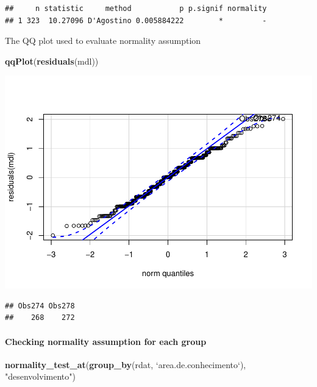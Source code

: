 \documentclass[]{article}
\newenvironment{Shaded}{\begin{snugshade}}{\end{snugshade}}
\newcommand{\DataTypeTok}[1]{\textcolor[rgb]{0.13,0.29,0.53}{#1}}
\newcommand{\KeywordTok}[1]{\textcolor[rgb]{0.13,0.29,0.53}{\textbf{#1}}}
\newcommand{\NormalTok}[1]{#1}
\newcommand{\StringTok}[1]{\textcolor[rgb]{0.31,0.60,0.02}{#1}}
\let\oldparagraph\paragraph
\renewcommand{\paragraph}[1]{\oldparagraph{#1}\mbox{}}
\begin{document}
\begin{verbatim}
##     n statistic     method           p p.signif normality
## 1 323  10.27096 D'Agostino 0.005884222        *         -
\end{verbatim}

The QQ plot used to evaluate normality assumption

\begin{Shaded}
\begin{Highlighting}[]
\KeywordTok{qqPlot}\NormalTok{(}\KeywordTok{residuals}\NormalTok{(mdl))}
\end{Highlighting}
\end{Shaded}

\includegraphics{factorialAnova_files/figure-latex/unnamed-chunk-7-1.pdf}

\begin{verbatim}
## Obs274 Obs278 
##    268    272
\end{verbatim}

\hypertarget{checking-normality-assumption-for-each-group}{%
\paragraph{Checking normality assumption for each
group}\label{checking-normality-assumption-for-each-group}}

\begin{Shaded}
\begin{Highlighting}[]
\KeywordTok{normality_test_at}\NormalTok{(}\KeywordTok{group_by}\NormalTok{(rdat, }\StringTok{`}\DataTypeTok{area.de.conhecimento}\StringTok{`}\NormalTok{), }\StringTok{"desenvolvimento"}\NormalTok{)}
\end{Highlighting}
\end{Shaded}
\end{document}
